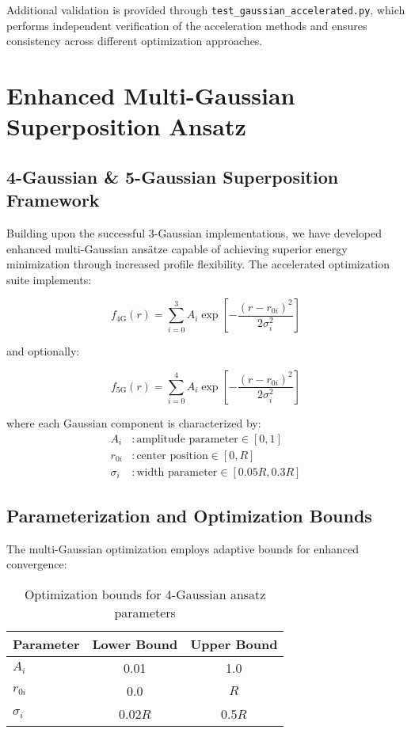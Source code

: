 \documentclass[12pt,a4paper]{article}
\begin{document}
Additional validation is provided through \texttt{test\_gaussian\_accelerated.py}, which performs independent verification of the acceleration methods and ensures consistency across different optimization approaches.

\section{Enhanced Multi-Gaussian Superposition Ansatz}
\label{sec:multi_gaussian}

\subsection{4-Gaussian \& 5-Gaussian Superposition Framework}

Building upon the successful 3-Gaussian implementations, we have developed enhanced multi-Gaussian ansätze capable of achieving superior energy minimization through increased profile flexibility. The accelerated optimization suite implements:

\begin{equation}
f_{\text{4G}}(r) = \sum_{i=0}^{3} A_i \exp\left[-\frac{(r - r_{0i})^2}{2\sigma_i^2}\right]
\end{equation}

and optionally:

\begin{equation}
f_{\text{5G}}(r) = \sum_{i=0}^{4} A_i \exp\left[-\frac{(r - r_{0i})^2}{2\sigma_i^2}\right]
\end{equation}

where each Gaussian component is characterized by:
\begin{align}
A_i &: \text{amplitude parameter} \in [0, 1] \\
r_{0i} &: \text{center position} \in [0, R] \\
\sigma_i &: \text{width parameter} \in [0.05R, 0.3R]
\end{align}

\subsection{Parameterization and Optimization Bounds}

The multi-Gaussian optimization employs adaptive bounds for enhanced convergence:

\begin{table}[h]
\centering
\begin{tabular}{lcc}
\toprule
Parameter & Lower Bound & Upper Bound \\
\midrule
$A_i$ & 0.01 & 1.0 \\
$r_{0i}$ & 0.0 & $R$ \\
$\sigma_i$ & 0.02$R$ & 0.5$R$ \\
\bottomrule
\end{tabular}
\caption{Optimization bounds for 4-Gaussian ansatz parameters}
\end{table}
\end{document}
